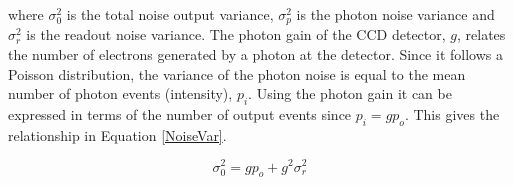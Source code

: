 where $\sigma_0^2$ is the total noise output variance, $\sigma_p^2$ is the photon noise variance and $\sigma_r^2$ is the readout noise variance.  The photon gain of the CCD detector, $g$, relates the number of electrons generated by a photon at the detector.  Since it follows a Poisson distribution, the variance of the photon noise is equal to the mean number of photon events (intensity), $p_i$.  Using the photon gain it can be expressed in terms of the number of output events since $p_i = gp_o$.  This gives the relationship in Equation \ref{NoiseVar}.

\begin{equation}
\sigma_0^2 = gp_o + g^2\sigma_r^2
\label{NoiseVar}
\end{equation}

